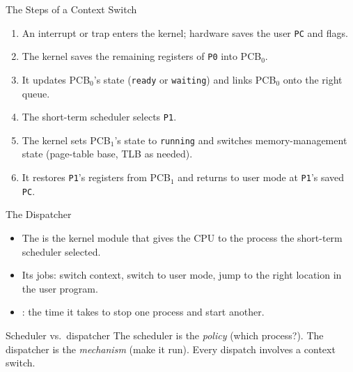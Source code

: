 \documentclass[aspectratio=169]{beamer}
\begin{document}
\begin{frame}{The Steps of a Context Switch}
  \begin{enumerate}
    \item An interrupt or trap enters the kernel; hardware saves the user
      \texttt{PC} and flags.
    \item The kernel saves the remaining registers of \texttt{P0} into
      PCB$_0$.
    \item It updates PCB$_0$'s state (\texttt{ready} or \texttt{waiting})
      and links PCB$_0$ onto the right queue.
    \item The short-term scheduler selects \texttt{P1}.
    \item The kernel sets PCB$_1$'s state to \texttt{running} and switches
      memory-management state (page-table base, TLB as needed).
    \item It restores \texttt{P1}'s registers from PCB$_1$ and returns to
      user mode at \texttt{P1}'s saved \texttt{PC}.
  \end{enumerate}
  \vspace{0.1cm}
\end{frame}

\begin{frame}{The Dispatcher}
  \begin{itemize}
    \item The  is the kernel module that gives the CPU to the
      process the short-term scheduler selected.
    \item Its jobs: switch context, switch to user mode, jump to the right
      location in the user program.
    \item {}: the time it takes to stop one process and
      start another.
  \end{itemize}
  \vspace{0.2cm}
  \begin{block}{Scheduler vs.\ dispatcher}
    The scheduler is the \emph{policy} (which process?). The dispatcher is
    the \emph{mechanism} (make it run). Every dispatch involves a context
    switch.
  \end{block}
\end{frame}
\end{document}
